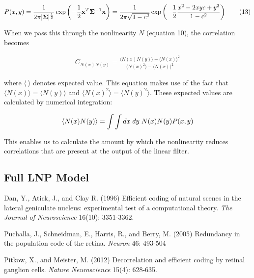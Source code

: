 \documentclass[12pt]{article}
\begin{document}
\begin{align}
\displaystyle P(x,y) = \frac{1}{2\pi |{\bf \Sigma}|^{\frac{1}{2}}}\exp\left( -\frac{1}{2}{\bf x}^T {\bf \Sigma}^{-1} {\bf x}\right)=\frac{1}{2\pi \sqrt{1-c^2}}\exp\left( -\frac{1}{2}\frac{x^2-2xyc+y^2}{1-c^2}\right) \tag{13}
\end{align}

\noindent When we pass this through the nonlinearity $N$ (equation 10), the correlation becomes

\begin{align}
\displaystyle C_{N(x)N(y)} = \frac{\langle N(x)N(y)\rangle- \langle N(x)\rangle^2}{\langle N(x)^2 \rangle - \langle N(x) \rangle^2} \tag{12}
\end{align}

\noindent where $\langle \:\rangle$ denotes expected value. This equation makes use of the fact that $\langle N(x) \rangle = \langle N(y) \rangle$ and $\langle N(x)^2 \rangle = \langle N(y)^2 \rangle$. These expected values are calculated by numerical integration:

\begin{align}
\langle N(x)N(y) \rangle = \int \int dx\;dy\;N(x)N(y)P(x,y) \notag
\end{align}

\noindent This enables us to calculate the amount by which the nonlinearity reduces correlations that are present at the output of the linear filter.

\subsection{Full LNP Model}



\newpage
\begin{thebibliography}{9}


 Dan, Y., Atick, J., and Clay R. (1996) Efficient coding of natural scenes in the lateral geniculate nucleus: experimental test of a computational theory. \textit{The Journal of Neuroscience} 16(10): 3351-3362.

 Puchalla, J., Schneidman, E., Harris, R., and Berry, M. (2005) Redundancy in the population code of the retina. \textit{Neuron} 46: 493-504

 Pitkow, X., and Meister, M. (2012) Decorrelation and efficient coding by retinal ganglion cells. \textit{Nature Neuroscience} 15(4): 628-635.


\end{thebibliography}
\end{document}
